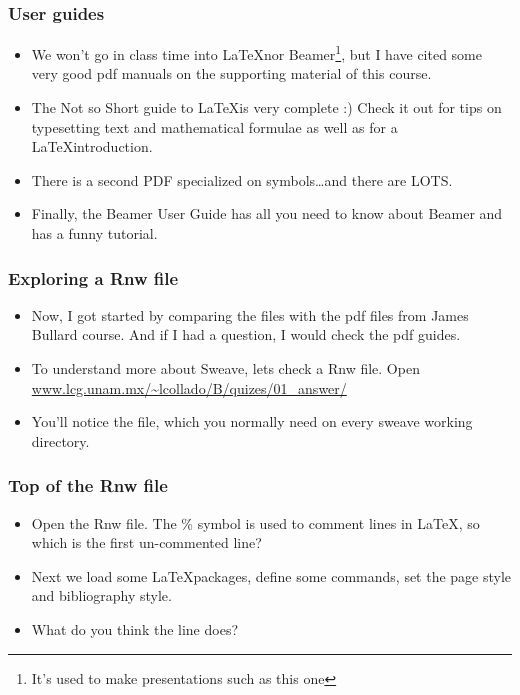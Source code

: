\begin{frame}[allowframebreaks]
  \frametitle{User guides}
  \begin{itemize}
  \item We won't go  in class time into \LaTeX nor Beamer\footnote{It's used to make presentations such as this one}, but I have cited some very good pdf manuals on the supporting material of this course. 
  \item The Not so Short guide to \LaTeX is very complete :) Check it out for tips on typesetting text and mathematical formulae as well as for a \LaTeX introduction.
  \item There is a second PDF specialized on symbols\ldots and there are LOTS.
  \item Finally, the Beamer User Guide has all you need to know about Beamer and has a funny tutorial.
  \end{itemize}
\end{frame}

\begin{frame}[allowframebreaks]
  \frametitle{Exploring a Rnw file}
  \begin{itemize}
  \item Now, I got started by comparing the  files with the pdf files from James Bullard course. And if I had a question, I would check the pdf guides.
  \item To understand more about Sweave, lets check a \alert{Rnw file}. Open \url{www.lcg.unam.mx/~lcollado/B/quizes/01_answer/}
  \item You'll notice the  file, which you normally need on every sweave working directory.
  \end{itemize}
\end{frame}

\begin{frame}[allowframebreaks]
  \frametitle{Top of the Rnw file}
  \begin{itemize}
  \item Open the Rnw file. The \% symbol is used to comment lines in \LaTeX, so which is the first un-commented line?
  \item Next we load some \LaTeX packages, define some commands, set the page style and bibliography style.
  \item What do you think the  line does?
  \end{itemize}
\end{frame}


